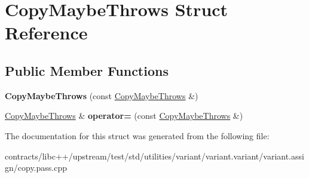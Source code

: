 \hypertarget{struct_copy_maybe_throws}{}\section{Copy\+Maybe\+Throws Struct Reference}
\label{struct_copy_maybe_throws}
\subsection*{Public Member Functions}
\begin{DoxyCompactItemize}
\item 
\mbox{\label{struct_copy_maybe_throws_a15991fea069beff6366ef0b225276138}} 
{\bfseries Copy\+Maybe\+Throws} (const \mbox{\hyperlink{struct_copy_maybe_throws}{Copy\+Maybe\+Throws}} \&)
\item 
\mbox{\label{struct_copy_maybe_throws_af1e8f4f75254961d5adfb5df3e25a064}} 
\mbox{\hyperlink{struct_copy_maybe_throws}{Copy\+Maybe\+Throws}} \& {\bfseries operator=} (const \mbox{\hyperlink{struct_copy_maybe_throws}{Copy\+Maybe\+Throws}} \&)
\end{DoxyCompactItemize}


The documentation for this struct was generated from the following file\+:\begin{DoxyCompactItemize}
\item 
contracts/libc++/upstream/test/std/utilities/variant/variant.\+variant/variant.\+assign/copy.\+pass.\+cpp\end{DoxyCompactItemize}
